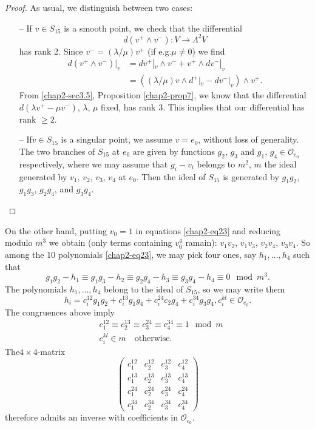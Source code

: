 \begin{proof}
As usual, we distinguish between two cases:
\begin{itemize}
\item[--] If $v\in S_{15}$ is a smooth point, we check that the
differential
$$
d(v^{+}\wedge v^{-}):V\to \Lambda^{2}V
$$
has rank 2. Since $v^{-}=(\lambda/\mu)v^{+}$ (if e.g.\@ $\mu\neq 0$)
we find
\begin{align*}
d(v^{+}\wedge v^{-})|_{v} &= dv^{+}|_{v}\wedge v^{-}+v^{+}\wedge
dv^{-}|_{v}\\
&= ((\lambda/\mu)v\wedge d^{+}|_{v}-dv^{-}|_{v})\wedge v^{+}.
\end{align*}
From \ref{chap2-sec3.5}, Proposition \ref{chap2-prop7}, we know that
the differential $d(\lambda v^{+}-\mu v^{-})$, $\lambda$, $\mu$ fixed,
has rank 3. This implies that our differential has rank $\geq 2$.

\item[--] If\pageoriginale $v\in S_{15}$ is a singular point, we
assume $v=e_{0}$, without loss of generality. The two branches of
$S_{15}$ at $e_{0}$ are given by functions $g_{2}$, $g_{3}$ and
$g_{1}$, $g_{4}\in \mathscr{O}_{e_{0}}$ respectively, where we may
assume that $g_{i}-v_{i}$ belongs to $m^{2}$, $m$ the ideal generated
by $v_{1}$, $v_{2}$, $v_{3}$, $v_{4}$ at $e_{0}$. Then the ideal of
$S_{15}$ is generated by $g_{1}g_{2}$, $g_{1}g_{3}$, $g_{2}g_{4}$, and
$g_{3}g_{4}$. 
\end{itemize}
\end{proof}

On the other hand, putting $v_{0}=1$ in equations \eqref{chap2-eq23}
and reducing modulo $m^{3}$ we obtain (only terms containing
$v^{4}_{0}$ ramain): $v_{1}v_{2}$, $v_{1}v_{3}$, $v_{2}v_{4}$,
$v_{3}v_{4}$. So among the 10 polynomials \eqref{chap2-eq23}, we may
pick four ones, say $h_{1},\ldots,h_{4}$ such that
$$
g_{1}g_{2}-h_{1}\equiv g_{1}g_{3}-h_{2}\equiv g_{2}g_{4}-h_{3}\equiv
g_{3}g_{4}-h_{4}\equiv 0\mod m^{3}.
$$
The polynomials $h_{1},\ldots,h_{4}$ belong to the ideal of $S_{15}$,
so we may write them
$$
h_{i}=c^{12}_{i}g_{1}g_{2}+c^{13}_{i}g_{1}g_{4}+c^{24}_{i}c_{2}g_{4}+c^{34}_{i}g_{3}g_{4},c^{kl}_{i}\in \mathscr{O}_{e_{0}}. 
$$
The congruences above imply
\begin{align*}
& c^{12}_{1}\equiv c^{13}_{2}\equiv c^{24}_{3}\equiv c^{34}_{4}\equiv
1\mod m\\[4pt]
& c^{kl}_{i}\in m\text{~~ otherwise.}
\end{align*}
The\pageoriginale $4\times 4$-matrix
$$
\begin{pmatrix}
c^{12}_{1} & c^{12}_{2} & c^{12}_{3} & c^{12}_{4}\\[4pt]
c^{13}_{1} & c^{13}_{2} & c^{13}_{3} & c^{13}_{4}\\[4pt]
c^{24}_{1} & c^{24}_{2} & c^{24}_{3} & c^{24}_{4}\\[4pt]
c^{34}_{1} & c^{34}_{2} & c^{34}_{3} & c^{34}_{4}
\end{pmatrix}
$$
therefore admits an inverse with coefficients in
$\mathscr{O}_{e_{0}}$.

